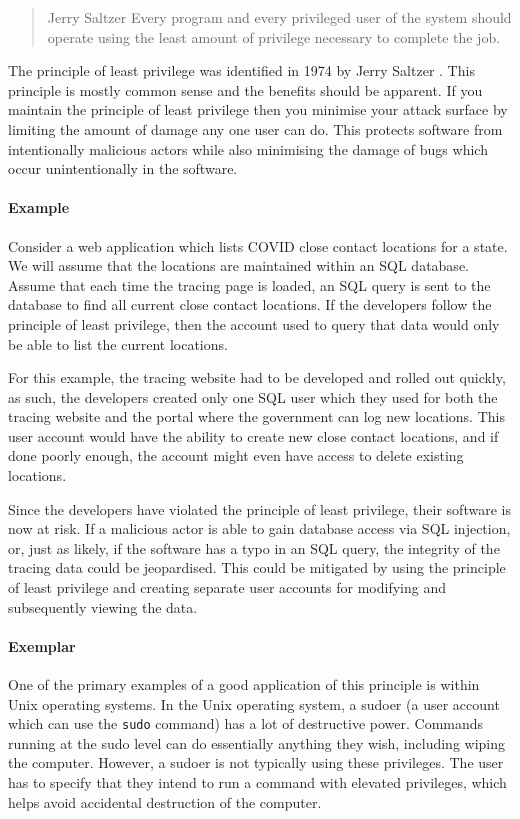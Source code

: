 \begin{quote}{Jerry Saltzer \cite{least-privilege}}
Every program and every privileged user of the system should operate using the least amount of privilege necessary to complete the job.
\end{quote}

\noindent The principle of least privilege was identified in 1974 by Jerry Saltzer \cite{least-privilege}.
This principle is mostly common sense and the benefits should be apparent.
If you maintain the principle of least privilege then you minimise your attack surface by limiting the amount of damage any one user can do.
This protects software from intentionally malicious actors while also minimising the damage of bugs which occur unintentionally in the software.

\paragraph{Example}
Consider a web application which lists COVID close contact locations for a state.
We will assume that the locations are maintained within an SQL database.
Assume that each time the tracing page is loaded, an SQL query is sent to the database to find all current close contact locations.
If the developers follow the principle of least privilege, then the account used to query that data would only be able to list the current locations.

For this example, the tracing website had to be developed and rolled out quickly, as such,
the developers created only one SQL user which they used for both the tracing website and the portal where the government can log new locations.
This user account would have the ability to create new close contact locations, and if done poorly enough,
the account might even have access to delete existing locations.

Since the developers have violated the principle of least privilege,
their software is now at risk.
If a malicious actor is able to gain database access via SQL injection, or,
just as likely, if the software has a typo in an SQL query, the integrity of the tracing data could be jeopardised.
This could be mitigated by using the principle of least privilege and creating separate user accounts for modifying and subsequently viewing the data.

\paragraph{Exemplar}
One of the primary examples of a good application of this principle is within Unix operating systems.
In the Unix operating system, a sudoer (a user account which can use the \texttt{sudo} command) has a lot of destructive power.
Commands running at the sudo level can do essentially anything they wish, including wiping the computer.
However, a sudoer is not typically using these privileges.
The user has to specify that they intend to run a command with elevated privileges,
which helps avoid accidental destruction of the computer.

